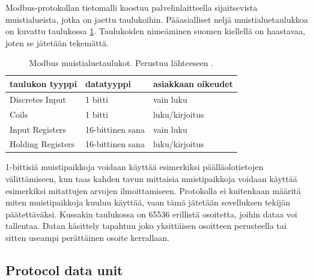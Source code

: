   Modbus-protokollan tietomalli koostuu palvelinlaitteella sijaitsevista muistialueista, jotka on jaettu taulukoihin. Pääasialliset neljä muistialuetaulukkoa on kuvattu taulukossa \ref{taulukot}. Taulukoiden nimeäminen suomen kiellellä on haastavaa, joten se jätetään tekemättä.
  \begin{table}[h]
    \centering
    \caption[Modbus muistialuetaulukot.]{Modbus muistialuetaulukot. Perustuu lähteeseen \parencite{modbusAppSpec}.}
    \begin{tabular}{|l|l|l|}
      \hline
      \rowcolor{gray} taulukon tyyppi         & datatyyppi      & asiakkaan oikeudet  \\ \hline
      \cellcolor{lightgray}Discretes Input    & 1 bitti          & vain luku           \\ \hline
      \cellcolor{lightgray}Coils              & 1 bitti          & luku/kirjoitus      \\ \hline
      \cellcolor{lightgray}Input Registers    & 16-bittinen sana & vain luku           \\ \hline
      \cellcolor{lightgray}Holding Registers  & 16-bittinen sana & luku/kirjoitus      \\ \hline
    \end{tabular}
    \label{taulukot}
  \end{table}
  1-bittisiä muistipaikkoja voidaan käyttää esimerkiksi päälläolotietojen välittämiseen, kun taas kahden tavun mittaisia muistipaikkoja voidaan käyttää esimerkiksi mitattujen arvojen ilmoittamiseen. Protokolla ei kuitenkaan määritä miten muistipaikkoja kuuluu käyttää, vaan tämä jätetään sovelluksen tekijän päätettäväksi. Kussakin taulukossa on 65536 erillistä osoitetta, joihin dataa voi tallentaa. Datan käsittely tapahtuu joko yksittäisen osoitteen perusteella tai sitten useampi perättäinen osoite kerrallaan. \parencite{modbusAppSpec}

  \subsection{Protocol data unit}

